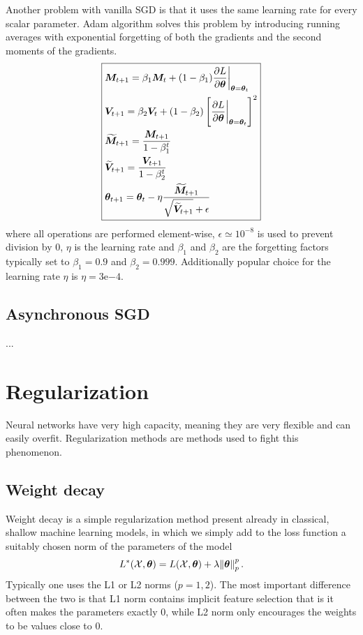 \documentclass{myclass}
\begin{document}
Another problem with vanilla SGD is that it uses the same learning rate for every scalar parameter.
Adam algorithm solves this problem by introducing running averages with exponential forgetting of
both the gradients and the second moments of the gradients.
\[
\boxed{
\begin{split} 
   &\bm{M}_{t+1} = \beta_1 \bm{M}_t + (1 - \beta_1) \pdv{L}{\bm{\theta}}\bigg|_{\bm{\theta} = \bm{\theta}_t} \\
   &\bm{V}_{t+1} = \beta_2 \bm{V}_t + (1 - \beta_2) \left[ \pdv{L}{\bm{\theta}}\bigg|_{\bm{\theta} = \bm{\theta}_t} \right]^2\\
   &\widetilde{\bm{M}}_{t+1} = \frac{\bm{M}_{t+1}}{1 - \beta_1^t} \\
   &\widetilde{\bm{V}}_{t+1} = \frac{\bm{V}_{t+1}}{1 - \beta_2^t} \\
   &\bm{\theta}_{t+1} = \bm{\theta}_t - \eta \frac{\widetilde{\bm{M}}_{t+1}}{\sqrt{\widetilde{\bm{V}}_{t+1}} + \epsilon}
\end{split}
}
\] 
where all operations are performed element-wise, \(\epsilon \simeq 10^{-8}\) is used to prevent
division by 0, \(\eta\) is the learning rate and \(\beta_1\) and \(\beta_2\) are the forgetting
factors typically set to \(\beta_1=0.9\) and \(\beta_2=0.999\). Additionally popular choice for the
learning rate \(\eta\) is \(\eta = 3\mathrm{e}{-4}\).


\subsection{Asynchronous SGD}

...


\section{Regularization}

Neural networks have very high capacity, meaning they are very flexible and can easily overfit.
Regularization methods are methods used to fight this phenomenon.


\subsection{Weight decay}

Weight decay is a simple regularization method present already in classical, shallow machine
learning models, in which we simply add to the loss function a suitably chosen norm of the
parameters of the model
\[
   L^*(\mathcal{X}, \bm{\theta}) = L(\mathcal{X}, \bm{\theta}) + \lambda \norm{\bm{\theta}}_p^p\,.
\]
Typically one uses the L1 or L2 norms (\(p=1,2\)). The most important difference between the two is
that L1 norm contains implicit feature selection that is it often makes the parameters exactly 0,
while L2 norm only encourages the weights to be values close to 0. 
\end{document}
